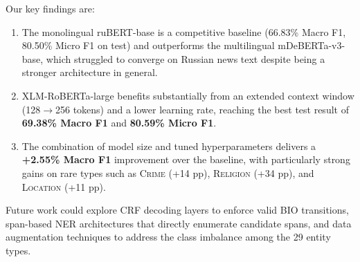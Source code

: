\documentclass{article}
\begin{document}
Our key findings are:
\begin{enumerate}
  \item The monolingual ruBERT-base is a competitive baseline
        (66.83\% Macro F1, 80.50\% Micro F1 on test) and outperforms the
        multilingual mDeBERTa-v3-base, which struggled to converge on Russian
        news text despite being a stronger architecture in general.
  \item XLM-RoBERTa-large benefits substantially from an extended context window
        (128$\to$256 tokens) and a lower learning rate, reaching the best test
        result of \textbf{69.38\% Macro F1} and \textbf{80.59\% Micro F1}.
  \item The combination of model size and tuned hyperparameters delivers a
        \textbf{+2.55\% Macro F1} improvement over the baseline, with
        particularly strong gains on rare types such as
        \textsc{Crime} (+14 pp), \textsc{Religion} (+34 pp), and
        \textsc{Location} (+11 pp).
\end{enumerate}

Future work could explore CRF decoding layers to enforce valid BIO transitions,
span-based NER architectures that directly enumerate candidate spans, and
data augmentation techniques to address the class imbalance among the 29 entity
types.



\end{document}
